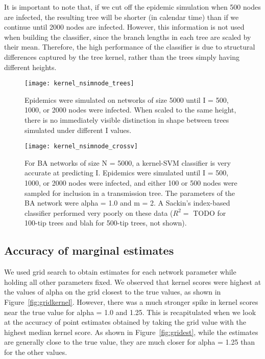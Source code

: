 It is important to note that, if we cut off the epidemic simulation when 500
nodes are infected, the resulting tree will be shorter (in calendar time) than
if we continue until 2000 nodes are infected. However, this information is not
used when building the classifier, since the branch lengths in each tree are
scaled by their mean. Therefore, the high performance of the classifier is due
to structural differences captured by the tree kernel, rather than the trees
simply having different heights.

\begin{figure}[ht]
  \centering
  \label{fig:prevtrees}
  \texttt{[image: kernel\_nsimnode\_trees]}
  \caption[Similarly shaped simulated under three values of \gls{I}]{
    Epidemics were simulated on networks of size 5000 until \gls{I} = 500,
    1000, or 2000 nodes were infected. When scaled to the same height, there is
    no immediately visible distinction in shape between trees simulated under
    different \gls{I} values.
  }
\end{figure}

\begin{figure}[ht]
  \centering
  \label{fig:prevcrossv}
  \texttt{[image: kernel\_nsimnode\_crossv]}
  \caption[Cross-validation performance of kernel-\gls{SVM} classifier for
           prevalence]{
    For \gls{BA} networks of size \gls{N} = 5000, a kernel-\gls{SVM} classifier
    is very accurate at predicting \gls{I}. Epidemics were simulated until
    \gls{I} = 500, 1000, or 2000 nodes were infected, and either 100 or 500
    nodes were sampled for inclusion in a transmission tree. The parameters of
    the \gls{BA} network were \gls{alpha} = 1.0 and \gls{m} = 2. A Sackin's
    index-based classifier performed very poorly on these data ($R^2 = $ TODO
    for 100-tip trees and blah for 500-tip trees, not shown).
  }
\end{figure}

\subsection{Accuracy of marginal estimates}

We used grid search to obtain  estimates for each network
parameter while holding all other parameters fixed. We observed that kernel
scores were highest at the values of \gls{alpha} on the grid closest to the
true values, as shown in Figure~\ref{fig:gridkernel}. However, there was a much
stronger spike in kernel scores near the true value for \gls{alpha} = 1.0 and
1.25. This is recapitulated when we look at the accuracy of point estimates
obtained by taking the grid value with the highest median kernel score. As
shown in Figure~\ref{fig:gridest}, while the estimates are generally close to
the true value, they are much closer for \gls{alpha} = 1.25 than for the other
values.


